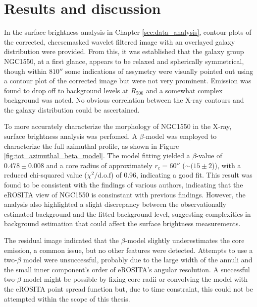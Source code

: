 
\chapter{Results and discussion}
\label{sec:conclusion}
In the surface brightness analysis in Chapter \ref{sec:data_analysis}, contour plots of the corrected, cheesemasked wavelet filtered image with an overlayed galaxy distribution were provided. From this, it was established that the galaxy group NGC1550, at a first glance, appears to be relaxed and spherically symmetrical, though within \(810''\) some indications of assymetry were visually pointed out using a contour plot of the corrected image but were not very prominent.  Emission was found to drop off to background levels at \(R_{500}\) and a somewhat complex background was noted. No obvious correlation between the X-ray contours and the galaxy distribution could be ascertained. 

To more accurately characterize the morphology of NGC1550 in the X-ray, surface brightness analysis was perfomed. A \(\beta\)-model was employed to characterize the full azimuthal profile, as shown in Figure \ref{fig:tot_azimuthal_beta_model}. The model fitting yielded a \(\beta\)-value of \(0.478 \pm 0.008\) and a core radius of approximately \(r_c = 60''\) (\(\sim (15\pm2\))), with a reduced chi-squared value (\(\chi^2 / \text{d.o.f}\)) of 0.96, indicating a good fit. This result was found to be consistent with the findings of various authors, indicating that the eROSITA view of NGC1550 is consinstant with previous findings.
However, the analysis also highlighted a slight discrepancy between the observationally estimated background and the fitted background level, suggesting complexities in background estimation that could affect the surface brightness measurements.

The residual image indicated that the \(\beta\)-model slightly underestimates the core emission, a common issue, but no other features were detected. Attempts to use a two-\(\beta\) model were unsuccessful, probably due to the large width of the annuli and the small inner component's order of eROSITA's angular resolution. A successful two-\(\beta\) model might be possible by fixing core radii or convolving the model with the eROSITA point spread function but, due to time constraint, this could not be attempted within the scope of this thesis.


